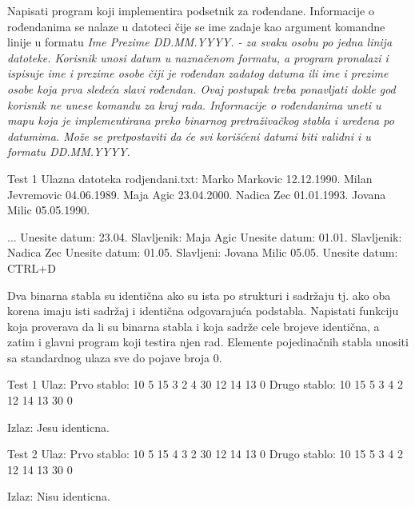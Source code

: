 \begin{Exercise}[label=706]
Napisati program koji implementira podsetnik za rođendane. Informacije o rođendanima se nalaze u datoteci čije se ime zadaje kao argument komandne linije u formatu \em{Ime Prezime DD.MM.YYYY.} - za svaku osobu po jedna linija datoteke. Korisnik unosi datum u naznačenom formatu, a program pronalazi i ispisuje ime i prezime osobe čiji je rođendan zadatog datuma ili ime i prezime osobe koja prva sledeća slavi rođendan. Ovaj postupak treba ponavljati dokle god korisnik ne unese komandu za kraj rada. Informacije o rođendanima uneti u mapu koja je implementirana preko binarnog pretraživačkog stabla i uređena po datumima. Može se pretpostaviti da će svi korišćeni datumi biti validni i u formatu DD.MM.YYYY.
\begin{maxitest}
\begin{test}{Test 1}
Ulazna datoteka rodjendani.txt:
Marko Markovic 12.12.1990.
Milan Jevremovic 04.06.1989.
Maja Agic 23.04.2000.
Nadica Zec 01.01.1993.
Jovana Milic 05.05.1990.

...
Unesite datum: 23.04.
Slavljenik: Maja Agic 
Unesite datum: 01.01.
Slavljenik: Nadica Zec
Unesite datum: 01.05.
Slavljeni: Jovana Milic 05.05.
Unesite datum: CTRL+D
\end{test}
\end{maxitest}
\end{Exercise}

\begin{Answer}[ref=706]
\end{Answer}



\begin{Exercise}[label=707]
Dva binarna stabla su identična ako su ista po strukturi i sadržaju tj. ako oba korena imaju isti sadržaj i identična odgovarajuća podstabla. Napistati funkciju  koja proverava da li su binarna stabla  i  koja sadrže cele brojeve identična, a zatim i glavni program koji testira njen rad. Elemente pojedinačnih stabla unositi sa standardnog ulaza sve do pojave broja 0.

\begin{maxitest}
\begin{test}{Test 1}
Ulaz:
Prvo stablo: 10 5 15 3 2 4 30 12 14 13 0
Drugo stablo: 10 15 5 3 4 2 12 14 13 30 0

Izlaz:
Jesu identicna.
\end{test}
\end{maxitest}

\begin{maxitest}
\begin{test}{Test 2}
Ulaz:
Prvo stablo: 10 5 15 4 3 2 30 12 14 13 0
Drugo stablo: 10 15 5 3 4 2 12 14 13 30 0

Izlaz:
Nisu identicna.
\end{test}
\end{maxitest}

\end{Exercise}

